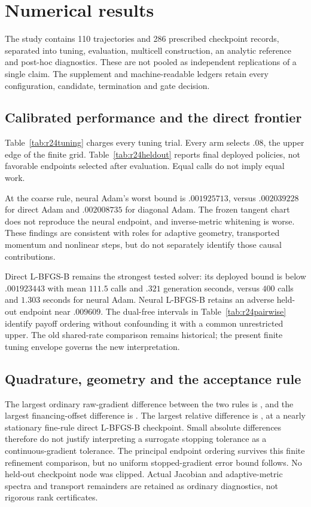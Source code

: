 \section{Numerical results}\label{sec:r24results}
The study contains 110 trajectories and 286 prescribed checkpoint records, separated into tuning, evaluation, multicell construction, an analytic reference and post-hoc diagnostics. These are not pooled as independent replications of a single claim. The supplement and machine-readable ledgers retain every configuration, candidate, termination and gate decision.

\subsection{Calibrated performance and the direct frontier}
Table~\ref{tab:r24tuning} charges every tuning trial. Every arm selects $.08$, the upper edge of the finite grid. Table~\ref{tab:r24heldout} reports final deployed policies, not favorable endpoints selected after evaluation. Equal calls do not imply equal work.


At the coarse rule, neural Adam's worst bound is $.001925713$, versus $.002039228$ for direct Adam and $.002008735$ for diagonal Adam. The frozen tangent chart does not reproduce the neural endpoint, and inverse-metric whitening is worse. These findings are consistent with roles for adaptive geometry, transported momentum and nonlinear steps, but do not separately identify those causal contributions.

Direct L-BFGS-B remains the strongest tested solver: its deployed bound is below $.001923443$ with mean $111.5$ calls and $.321$ generation seconds, versus $400$ calls and $1.303$ seconds for neural Adam. Neural L-BFGS-B retains an adverse held-out endpoint near $.009609$. The dual-free intervals in Table~\ref{tab:r24pairwise} identify payoff ordering without confounding it with a common unrestricted upper. The old shared-rate comparison remains historical; the present finite tuning envelope governs the new interpretation.


\subsection{Quadrature, geometry and the acceptance rule}
The largest ordinary raw-gradient difference between the two rules is \RXXIVGradientDiff{}, and the largest financing-offset difference is \RXXIVOffsetDiff{}. The largest relative difference is \RXXIVRelativeGradientDiff{}, at a nearly stationary fine-rule direct L-BFGS-B checkpoint. Small absolute differences therefore do not justify interpreting a surrogate stopping tolerance as a continuous-gradient tolerance. The principal endpoint ordering survives this finite refinement comparison, but no uniform stopped-gradient error bound follows. No held-out checkpoint node was clipped. Actual Jacobian and adaptive-metric spectra and transport remainders are retained as ordinary diagnostics, not rigorous rank certificates.


